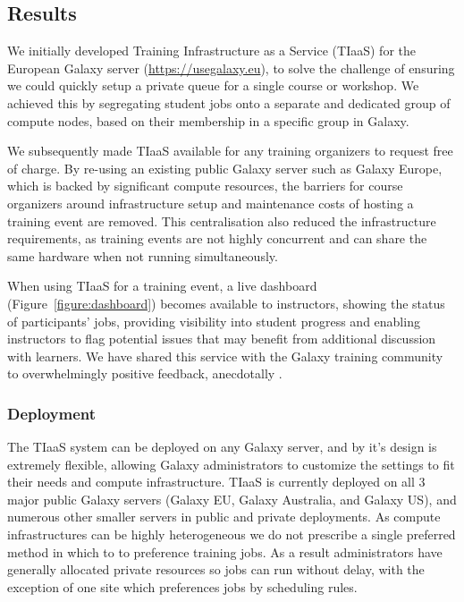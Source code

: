 \documentclass[a4paper,num-refs]{oup-contemporary}
\begin{document}
\subsection{Results}

We initially developed Training Infrastructure as a Service (TIaaS) for the European Galaxy server (\url{https://usegalaxy.eu}), to solve the challenge of ensuring we could quickly setup a private queue for a single course or workshop. We achieved this by segregating student jobs onto a separate and dedicated group of compute nodes, based on their membership in a specific group in Galaxy.

We subsequently made TIaaS available for any training organizers to request free of charge. By re-using an existing public Galaxy server such as Galaxy Europe, which is backed by significant compute resources, the barriers for course organizers around infrastructure setup and maintenance costs of hosting a training event are removed. This centralisation also reduced the infrastructure requirements, as training events are not highly concurrent and can share the same hardware when not running simultaneously.

When using TIaaS for a training event, a live dashboard (Figure~\ref{figure:dashboard}) becomes available to instructors, showing the status of participants' jobs, providing visibility into student progress and enabling instructors to flag potential issues that may benefit from additional discussion with learners. We have shared this service with the Galaxy training community to overwhelmingly positive feedback, anecdotally \cite{tiaas_feedback}.

\subsubsection{Deployment}

The TIaaS system can be deployed on any Galaxy server, and by it's design is extremely flexible, allowing Galaxy administrators to customize the settings to fit their needs and compute infrastructure. TIaaS is currently deployed on all 3 major public Galaxy servers (Galaxy EU, Galaxy Australia, and Galaxy US), and numerous other smaller servers in public and private deployments. As compute infrastructures can be highly heterogeneous we do not prescribe a single preferred method in which to to preference training jobs. As a result administrators have generally allocated private resources so jobs can run without delay, with the exception of one site which preferences jobs by scheduling rules.
\end{document}
